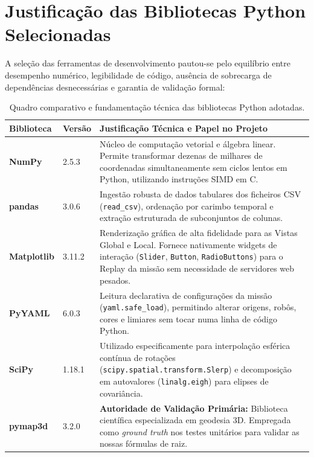 \documentclass[11pt,a4paper]{article}
\begin{document}
\section{Justificação das Bibliotecas Python Selecionadas}

A seleção das ferramentas de desenvolvimento pautou-se pelo equilíbrio entre desempenho numérico, legibilidade de código, ausência de sobrecarga de dependências desnecessárias e garantia de validação formal:

\begin{table}[H]
\centering
\small
\caption{Quadro comparativo e fundamentação técnica das bibliotecas Python adotadas.}
\label{tab:bibliotecas}
\begin{tabular}{@{}llp{8.5cm}@{}}
\toprule
\textbf{Biblioteca} & \textbf{Versão} & \textbf{Justificação Técnica e Papel no Projeto} \\
\midrule
\textbf{NumPy} & 2.5.3 & Núcleo de computação vetorial e álgebra linear. Permite transformar dezenas de milhares de coordenadas simultaneamente sem ciclos lentos em Python, utilizando instruções SIMD em C. \\
\addlinespace
\textbf{pandas} & 3.0.6 & Ingestão robusta de dados tabulares dos ficheiros CSV (\texttt{read\_csv}), ordenação por carimbo temporal e extração estruturada de subconjuntos de colunas. \\
\addlinespace
\textbf{Matplotlib} & 3.11.2 & Renderização gráfica de alta fidelidade para as Vistas Global e Local. Fornece nativamente widgets de interação (\texttt{Slider}, \texttt{Button}, \texttt{RadioButtons}) para o Replay da missão sem necessidade de servidores web pesados. \\
\addlinespace
\textbf{PyYAML} & 6.0.3 & Leitura declarativa de configurações da missão (\texttt{yaml.safe\_load}), permitindo alterar origens, robôs, cores e limiares sem tocar numa linha de código Python. \\
\addlinespace
\textbf{SciPy} & 1.18.1 & Utilizado especificamente para interpolação esférica contínua de rotações (\texttt{scipy.spatial.transform.Slerp}) e decomposição em autovalores (\texttt{linalg.eigh}) para elipses de covariância. \\
\addlinespace
\textbf{pymap3d} & 3.2.0 & \textbf{Autoridade de Validação Primária:} Biblioteca científica especializada em geodesia 3D. Empregada como \textit{ground truth} nos testes unitários para validar as nossas fórmulas de raiz. \\

\end{tabular}
\end{table}
\end{document}
